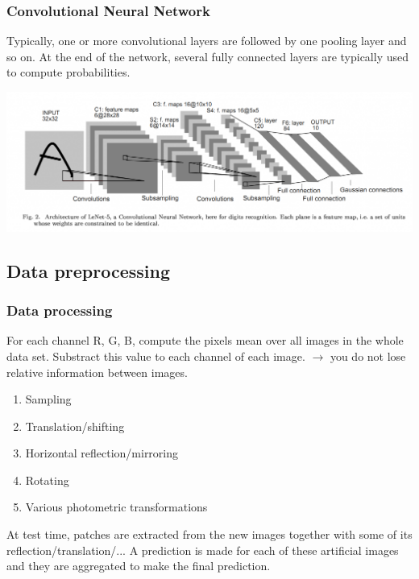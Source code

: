 \begin{frame}
	\frametitle{Convolutional Neural Network}

Typically, one or more convolutional layers are followed by one pooling layer and so on. At the end of the network, several fully connected layers are typically used to compute probabilities.

\begin{center}
	\includegraphics[scale=0.3]{figs/LeNet}
\end{center}
\end{frame}


\subsection{Data preprocessing}

\begin{frame}
	\frametitle{Data processing}


	For each channel R, G, B, compute the pixels mean over all images in the whole data set. Substract this value to each channel of each image.
	$\rightarrow$ you do not lose relative information between images.

	\bigskip

	\begin{enumerate}
		\item Sampling
		\item Translation/shifting
		\item Horizontal reflection/mirroring
		\item Rotating
		\item Various photometric transformations
	\end{enumerate}


	At test time, patches are extracted from the new images together with some of its reflection/translation/... A prediction is made for each of these artificial images and they are aggregated to make the final prediction.

\end{frame}



